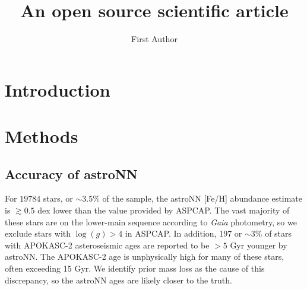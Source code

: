 \documentclass[twocolumn]{aastex631}
\begin{document}
\title{An open source scientific article}

\author[0000-0000-0000-0000]{First Author}

\begin{abstract}
    \blindtext
\end{abstract}

\section{Introduction}
\Blindtext[4]

\section{Methods}

\subsection{Accuracy of astroNN}

For $19784$ stars, or $\sim3.5\%$ of the sample, the astroNN [Fe/H] abundance estimate is $\gtrsim0.5$ dex lower than the value provided by ASPCAP. The vast majority of these stars are on the lower-main sequence according to \textit{Gaia} photometry, so we exclude stars with $\log(g) > 4$ in ASPCAP. In addition, 197 or $\sim3\%$ of stars with APOKASC-2 asteroseismic ages are reported to be $>5$ Gyr younger by astroNN. The APOKASC-2 age is unphysically high for many of these stars, often exceeding 15 Gyr. We identify prior mass loss as the cause of this discrepancy, so the astroNN ages are likely closer to the truth.
\end{document}
